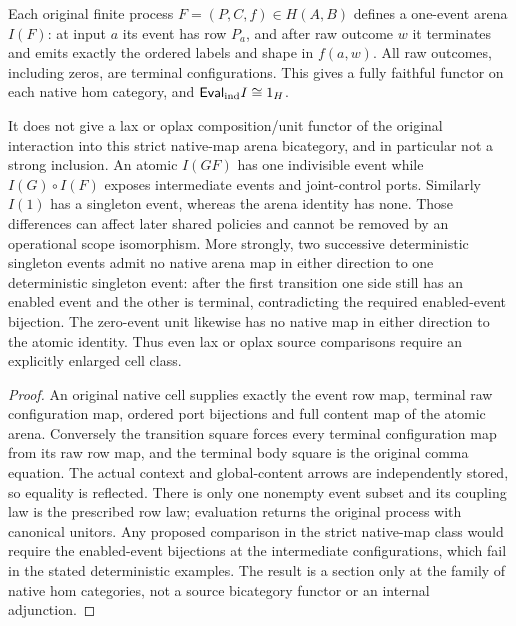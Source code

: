 \documentclass[11pt]{article}
\begin{document}
\begin{theorem}
Each original finite process $F=(P,C,f)\in H(A,B)$ defines a one-event arena $I(F)$: at input $a$ its event has row $P_a$, and after raw outcome $w$ it terminates and emits exactly the ordered labels and shape in $f(a,w)$. All raw outcomes, including zeros, are terminal configurations. This gives a fully faithful functor on each native hom category, and $\mathsf{Eval}_{\rm ind}I\cong1_H$.

It does not give a lax or oplax composition/unit functor of the original interaction into this strict native-map arena bicategory, and in particular not a strong inclusion. An atomic $I(GF)$ has one indivisible event while $I(G)\circ I(F)$ exposes intermediate events and joint-control ports. Similarly $I(1)$ has a singleton event, whereas the arena identity has none. Those differences can affect later shared policies and cannot be removed by an operational scope isomorphism. More strongly, two successive deterministic singleton events admit no native arena map in either direction to one deterministic singleton event: after the first transition one side still has an enabled event and the other is terminal, contradicting the required enabled-event bijection. The zero-event unit likewise has no native map in either direction to the atomic identity. Thus even lax or oplax source comparisons require an explicitly enlarged cell class.
\end{theorem}
\begin{proof}
An original native cell supplies exactly the event row map, terminal raw configuration map, ordered port bijections and full content map of the atomic arena. Conversely the transition square forces every terminal configuration map from its raw row map, and the terminal body square is the original comma equation. The actual context and global-content arrows are independently stored, so equality is reflected. There is only one nonempty event subset and its coupling law is the prescribed row law; evaluation returns the original process with canonical unitors. Any proposed comparison in the strict native-map class would require the enabled-event bijections at the intermediate configurations, which fail in the stated deterministic examples. The result is a section only at the family of native hom categories, not a source bicategory functor or an internal adjunction.\end{proof}
\end{document}
